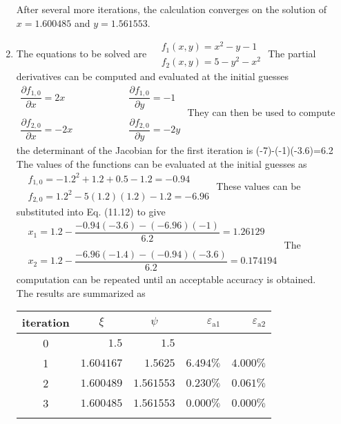 \documentclass[../main.tex]{subfiles}
\begin{document}
\begin{enumerate}[label=\bfseries(\alph*)]
\bigbreak
After several more iterations, the calculation converges on the solution of $x=1.600485$ and $y=1.561553 .$
\bigbreak
\item The equations to be solved are
\bigbreak$
\begin{aligned}
&f_{1}(x, y)=x^{2}-y-1 \\
&f_{2}(x, y)=5-y^{2}-x^{2}
\end{aligned}$
\bigbreak
The partial derivatives can be computed and evaluated at the initial guesses
\bigbreak
$\begin{array}{ll}
\dfrac{\partial f_{1,0}}{\partial x}=2 x &\quad\quad\quad\quad\quad \dfrac{\partial f_{1,0}}{\partial y}=-1 \\\\
\dfrac{\partial f_{2,0}}{\partial x}=-2 x &\quad\quad\quad\quad\quad \dfrac{\partial f_{2,0}}{\partial y}=-2 y
\end{array}$
\bigbreak
They can then be used to compute the determinant of the Jacobian for the first iteration is
(-7)-(-1)(-3.6)=6.2
\bigbreak
The values of the functions can be evaluated at the initial guesses as
\bigbreak$
\begin{aligned}
&f_{1,0}=-1.2^{2}+1.2+0.5-1.2=-0.94 \\
&f_{2,0}=1.2^{2}-5(1.2)(1.2)-1.2=-6.96
\end{aligned}$
\bigbreak
These values can be substituted into Eq. (11.12) to give
\bigbreak
$\begin{aligned}
&x_{1}=1.2-\dfrac{-0.94(-3.6)-(-6.96)(-1)}{6.2}=1.26129 \\\\
&x_{2}=1.2-\dfrac{-6.96(-1.4)-(-0.94)(-3.6)}{6.2}=0.174194
\end{aligned}$
\bigbreak
The computation can be repeated until an acceptable accuracy is obtained.\\ The results are summarized as
\bigbreak
\begin{tabular}{crrrr}
\Xhline{1.5pt}
iteration & \multicolumn{1}{c}{$\xi$} & \multicolumn{1}{c}{$\psi$} & $\varepsilon_{\mathrm{a} 1}$ & $\varepsilon_{\mathrm{a} 2}$ \\
\hline
0 & $1.5$ & $1.5$ &  &  \\
1 & $1.604167$ & $1.5625$ & $6.494 \%$ & $4.000 \%$ \\
2 & $1.600489$ & $1.561553$ & $0.230 \%$ & $0.061 \%$ \\
3 & $1.600485$ & $1.561553$ & $0.000 \%$ & $0.000 \%$ \\
\Xhline{1.5pt}
\end{tabular}






\end{enumerate}
\end{document}
